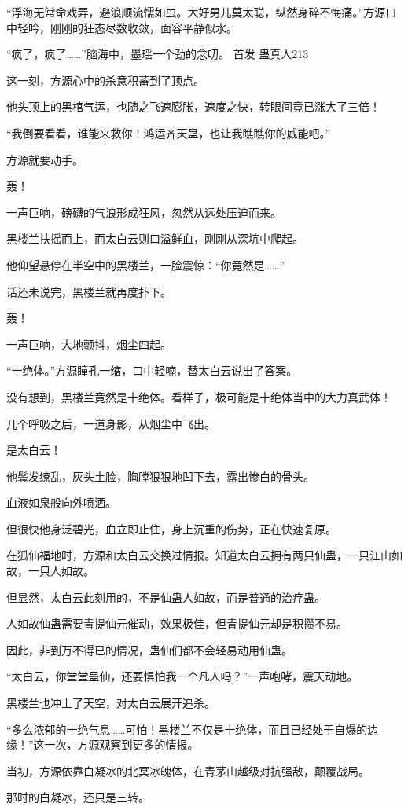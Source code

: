 \begin{this_body}
“浮海无常命戏弄，避浪顺流懦如虫。大好男儿莫太聪，纵然身碎不悔痛。”方源口中轻吟，刚刚的狂态尽数收敛，面容平静似水。

“疯了，疯了……”脑海中，墨瑶一个劲的念叨。  首发 蛊真人213

这一刻，方源心中的杀意积蓄到了顶点。

他头顶上的黑棺气运，也随之飞速膨胀，速度之快，转眼间竟已涨大了三倍！

“我倒要看看，谁能来救你！鸿运齐天蛊，也让我瞧瞧你的威能吧。”

方源就要动手。

轰！

一声巨响，磅礴的气浪形成狂风，忽然从远处压迫而来。

黑楼兰扶摇而上，而太白云则口溢鲜血，刚刚从深坑中爬起。

他仰望悬停在半空中的黑楼兰，一脸震惊：“你竟然是……”

话还未说完，黑楼兰就再度扑下。

轰！

一声巨响，大地颤抖，烟尘四起。

“十绝体。”方源瞳孔一缩，口中轻喃，替太白云说出了答案。

没有想到，黑楼兰竟然是十绝体。看样子，极可能是十绝体当中的大力真武体！

几个呼吸之后，一道身影，从烟尘中飞出。

是太白云！

他鬓发缭乱，灰头土脸，胸膛狠狠地凹下去，露出惨白的骨头。

血液如泉般向外喷洒。

但很快他身泛碧光，血立即止住，身上沉重的伤势，正在快速复原。

在狐仙福地时，方源和太白云交换过情报。知道太白云拥有两只仙蛊，一只江山如故，一只人如故。

但显然，太白云此刻用的，不是仙蛊人如故，而是普通的治疗蛊。

人如故仙蛊需要青提仙元催动，效果极佳，但青提仙元却是积攒不易。

因此，非到万不得已的情况，蛊仙们都不会轻易动用仙蛊。

“太白云，你堂堂蛊仙，还要惧怕我一个凡人吗？”一声咆哮，震天动地。

黑楼兰也冲上了天空，对太白云展开追杀。

“多么浓郁的十绝气息……可怕！黑楼兰不仅是十绝体，而且已经处于自爆的边缘！”这一次，方源观察到更多的情报。

当初，方源依靠白凝冰的北冥冰魄体，在青茅山越级对抗强敌，颠覆战局。

那时的白凝冰，还只是三转。


\end{this_body}
